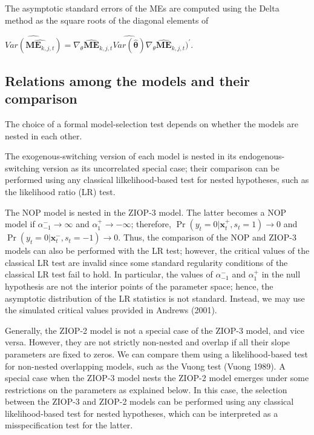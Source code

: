 \documentclass[letterpaper,fleqn,12pt]{article}
\begin{document}
\begin{onehalfspace}
The asymptotic standard errors of the MEs are computed using the Delta
method as the square roots of the diagonal elements of

\begin{center}
$\widehat{Var(\widehat{\underset{}{\mathbf{ME}_{k,j,t}}})}=\nabla _{\theta }%
\widehat{\mathbf{ME}}_{k,j,t}\widehat{Var(\widehat{\mathbf{\theta }})}\nabla
_{\theta }\widehat{\mathbf{ME}}_{k,j,t})^{\prime }$.
\end{center}

\subsection{\noindent Relations among the models and their comparison}

The choice of a formal model-selection test depends on whether the models
are nested in each other.

The exogenous-switching version of each model is nested in its
endogenous-switching version as its uncorrelated special case; their
comparison can be performed using any classical lilkelihood-based test for
nested hypotheses, such as the likelihood ratio (LR) test.

The NOP model is nested in the ZIOP-3 model. The latter becomes a NOP model
if $\alpha _{-1}^{-}\rightarrow \infty $ and $\alpha _{1}^{+}\rightarrow
-\infty $; therefore, $\Pr (y_{t}=0|\mathbf{x}_{t}^{+},s_{t}=1)\rightarrow 0$
and $\Pr (y_{t}=0|\mathbf{x}_{t}^{-},s_{t}=-1)\rightarrow 0$. Thus, the
comparison of the NOP and ZIOP-3 models can also be performed with the LR
test; however, the critical values of the classical LR test are invalid
since some standard regularity conditions of the classical LR test fail to
hold. In particular, the values of $\alpha _{-1}^{-}$ and $\alpha _{1}^{+}$
in the null hypothesis are not the interior points of the parameter space;
hence, the asymptotic distribution of the LR statistics is not standard.
Instead, we may use the simulated critical values provided in Andrews (2001).

Generally, the ZIOP-2 model is not a special case of the ZIOP-3 model, and
vice versa. However, they are not strictly non-nested and overlap if all
their slope parameters are fixed to zeros. We can compare them using a
likelihood-based test for non-nested overlapping models, such as the Vuong
test (Vuong 1989). A special case when the ZIOP-3 model nests the ZIOP-2
model emerges under some restrictions on the parameters as explained below.
In this case, the selection between the ZIOP-3 and ZIOP-2 models can be
performed using any classical likelihood-based test for nested hypotheses,
which can be interpreted as a misspecification test for the latter.


\end{onehalfspace}
\end{document}
